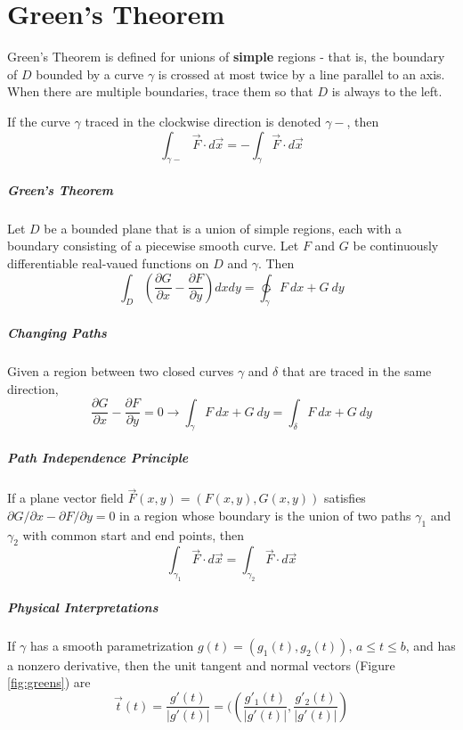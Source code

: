 \documentclass[11pt]{article}
\begin{document}
\section{Green's Theorem}
	Green's Theorem is defined for unions of \textbf{simple} regions - that is, the boundary of $D$ bounded by a curve $\gamma$ is crossed at most twice by a line parallel to an axis. When there are multiple boundaries, trace them so that $D$ is always to the left.
	
	If the curve $\gamma$ traced in the clockwise direction is denoted $\gamma -$, then
	\begin{equation}
		\int_{\gamma -} \vec{F} \cdot d\vec{x} = - \int_\gamma \vec{F} \cdot d\vec{x}
	\end{equation}
	
	\subparagraph{Green's Theorem} Let $D$ be a bounded plane that is a union of simple regions, each with a boundary consisting of a piecewise smooth curve. Let $F$ and $G$ be continuously differentiable real-vaued functions on $D$ and $\gamma$. Then
	\begin{equation}
		\int_D \left( \frac{\partial G}{\partial x} - \frac{\partial F}{\partial y} \right) dxdy = \ointctrclockwise_\gamma F\ dx + G\ dy
	\end{equation}
	
	\subparagraph{Changing Paths}
		Given a region between two closed curves $\gamma$ and $\delta$ that are traced in the same direction,
		\begin{equation}
			\frac{\partial G}{\partial x} - \frac{\partial F}{\partial y} = 0 \rightarrow \int_\gamma F\ dx + G\ dy = \int_\delta F\ dx + G\ dy
		\end{equation}
		
	\subparagraph{Path Independence Principle} If a plane vector field $\vec{F}(x, y) = ( F(x, y), G(x, y) )$ satisfies $\partial G / \partial x - \partial F / \partial y = 0$ in a region whose boundary is the union of two paths $\gamma_1$ and $\gamma_2$ with common start and end points, then
		\begin{equation}
			\int_{\gamma_1} \vec{F} \cdot d\vec{x} = \int_{\gamma_2} \vec{F} \cdot d\vec{x}
		\end{equation}
		
	\subparagraph{Physical Interpretations} If $\gamma$ has a smooth parametrization $g(t) = (g_1(t), g_2(t))$, $a \leq t \leq b$, and has a nonzero derivative, then the unit tangent and normal vectors (Figure \ref{fig:greens})  are
		\begin{equation}
			\vec{t}(t) = \frac{g'(t)}{|g'(t)|} = (\left( \frac{g'_1(t)}{|g'(t)|}, \frac{g'_2(t)}{|g'(t)|} \right)
		\end{equation}
		
\end{document}
